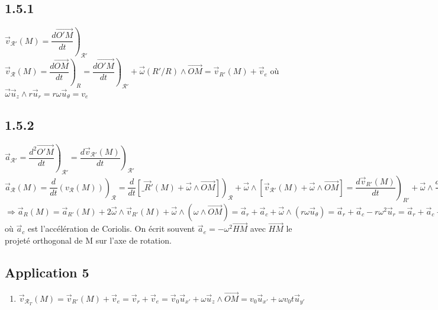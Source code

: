\documentclass[a4paper,12pt]{book}
\begin{document}
\subsection{1.5.1}
$\vec{v}_{\mathcal{R}'}(M) = \left.\dfrac{d\vec{O'M}}{dt}\right)_{\mathcal{R}'}$
\\ $\vec{v}_\mathcal{R}(M) = \left.\dfrac{d\vec{OM}}{dt}\right)_R = \left.\dfrac{d\vec{O'M}}{dt}\right)_{\mathcal{R}'} + \vec{\omega}(R'/R)\wedge \vec{OM} = \vec{v}_{R'}(M) + \vec{v}_e$ où $\vec{\omega} \vec{u}_z\wedge r\vec{u}_r = r\omega \vec{u}_\theta = v_e$

\subsection{1.5.2}
$\vec{a}_{\mathcal{R}'} = \left.\dfrac{d^2\vec{O'M}}{dt}\right)_{\mathcal{R}'} = \left.\dfrac{d\vec{v}_{\mathcal{R}'}(M)}{dt}\right)_{\mathcal{R}'}$
\\ $\vec{a}_\mathcal{R}(M) = \left.\dfrac{d}{dt}(v_\mathcal{R}(M))\right)_\mathcal{R} = \left.\dfrac{d}{dt}\left[\_{\vec{R}'}(M) + \vec{\omega}\wedge \vec{OM}\right]\right)_\mathcal{R} + \vec{\omega}\wedge \left[\vec{v}_{\mathcal{R}'}(M) + \vec{\omega}\wedge \vec{OM}\right] = \left.\dfrac{d\vec{v}_{R'}(M)}{dt}\right)_{R'} + \vec{\omega} \wedge \left.\dfrac{d\vec{OM}}{dt}\right)_{\mathcal{R}'} + \vec{\omega}\wedge \vec{v}_{\mathcal{R}'}(M) + \vec{\omega}\wedge (\vec{\omega}\wedge \vec{OM}) = \left.\dfrac{d\vec{v}_{\mathcal{R}'}(M)}{dt}\right)_{\mathcal{R}'} + \vec{\omega} \wedge \vec{v}_{\mathcal{R}'}(M) + \vec{\omega}\wedge \vec{v}_{\mathcal{R}'}(M) + \vec{\omega}\wedge (\vec{\omega}\wedge \vec{OM})$
\\ $\Rightarrow \vec{a}_R(M) = \vec{a}_{R'}(M) + 2\vec{\omega}\wedge \vec{v}_{R'}(M) + \vec{\omega}\wedge(\omega\wedge \vec{OM}) = \vec{a}_r + \vec{a}_c +\vec{\omega}\wedge (r\omega\vec{u}_\theta) =\vec{a}_r + \vec{a}_c - r\omega^2\vec{u}_r = \vec{a}_r+\vec{a}_c+\vec{a}_e$ où $\vec{a}_c$ est l'accélération de Coriolis. On écrit souvent $\vec{a}_e = - \omega^2\vec{HM}$ avec $\vec{HM}$ le projeté orthogonal de M sur l'axe de rotation.

\subsection{Application 5}
\begin{enumerate}
\item $\vec{v}_{\mathcal{R}_T}(M) = \vec{v}_{R'}(M) + \vec{v}_e = \vec{v}_r + \vec{v}_e = \vec{v}_0\vec{u}_{x'} + \omega \vec{u}_{z}\wedge\vec{OM} = v_0\vec{u}_{x'} + \omega v_0t\vec{u}_{y'}$
\end{enumerate}
\end{document}
